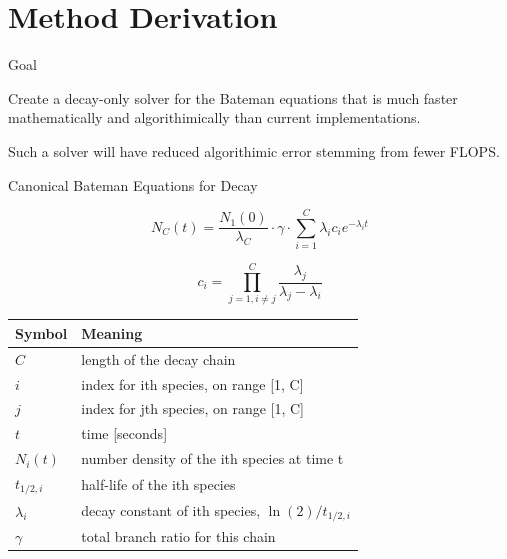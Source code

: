 \documentclass[xcolor=x11names,compress]{beamer}
\begin{document}
\section{Method Derivation}
\begin{frame}{Goal}

    \vspace*{3em}
    Create a decay-only solver for the Bateman equations 
    that is much faster mathematically and algorithimically than current 
    implementations. 

    \vspace*{1em}
    Such a solver will have reduced algorithimic error stemming from fewer 
    FLOPS.
    
\end{frame}

\begin{frame}{Canonical Bateman Equations for Decay}

\begin{equation}
\label{bm-eq}
N_C(t) = \frac{N_1(0)}{\lambda_C} \cdot \gamma \cdot \sum_{i=1}^C \lambda_i c_{i} e^{-\lambda_i t}
\end{equation}

\begin{equation}
\label{c_i}
c_i = \prod_{j=1,i\ne j}^C \frac{\lambda_j}{\lambda_j - \lambda_i}
\end{equation}

\begin{table}[hbt]
\label{decay-symbol-meaning}
\begin{tabular}{|l|l|}
\hline
\textbf{Symbol} & \textbf{Meaning} \\
\hline
$C$         & length of the decay chain\\
$i$         & index for ith species, on range [1, C]\\
$j$         & index for jth species, on range [1, C]\\
$t$         & time [seconds]\\
$N_i(t)$    & number density of the ith species at time t\\
$t_{1/2,i}$ & half-life of the ith species\\
$\lambda_i$ & decay constant of ith species, $\ln(2)/t_{1/2,i}$\\
$\gamma$    & total branch ratio for this chain\\
\hline
\end{tabular}
\end{table}
    
\end{frame}
\end{document}
